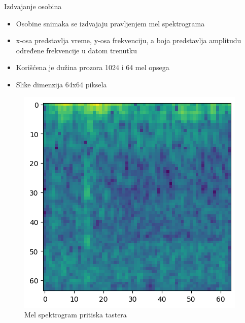 \documentclass{beamer}
\begin{document}
\begin{frame}{Izdvajanje osobina}
    \begin{itemize}
        \item Osobine snimaka se izdvajaju pravljenjem mel spektrograma
        \item x-osa predstavlja vreme, y-osa frekvenciju, a boja predstavlja amplitudu određene frekvencije u datom trenutku
        \item Korišćena je dužina prozora 1024 i 64 mel opsega
        \item Slike dimenzija 64x64 piksela
    \end{itemize}
    \begin{figure}
        \centering
        \includegraphics[scale=0.35]{MelSpectrogram.png}
        \centering
        \captionsetup{justification=centering}
        \caption{Mel spektrogram pritiska tastera}
        \label{fig:my_label}
    \end{figure}
\end{frame}
\end{document}
